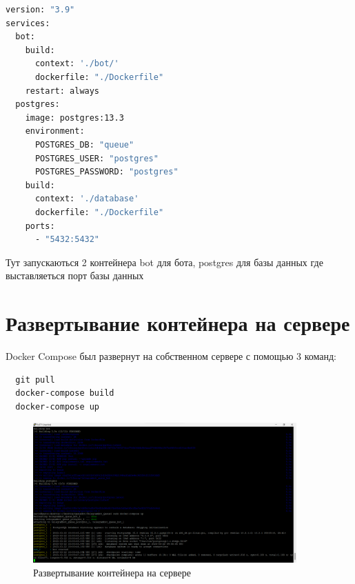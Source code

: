 \begin{lstlisting}[language=Dockerfile
, caption=\leftline{Dockerfile базы данных}
, label=lst:DС]
version: "3.9"
services:
  bot:
    build:
      context: './bot/'
      dockerfile: "./Dockerfile"
    restart: always
  postgres:
    image: postgres:13.3
    environment:
      POSTGRES_DB: "queue"
      POSTGRES_USER: "postgres"
      POSTGRES_PASSWORD: "postgres"
    build:
      context: './database'
      dockerfile: "./Dockerfile"
    ports:
      - "5432:5432"
\end{lstlisting}

Тут запускаються 2 контейнера bot для бота, postgres для базы данных где выставляеться порт базы данных \par

\section{Развертывание контейнера на сервере}
Docker Compose был развернут на собственном сервере с помощью 3 команд: \par
\begin{verbatim}
  git pull
  docker-compose build
  docker-compose up
\end{verbatim}

\begin{figure}[h!tp]
  \centering
  \includegraphics[width=0.9\textwidth]{server_run}
  \caption{Развертывание контейнера на сервере}
  \label{fig:server:run}
\end{figure}